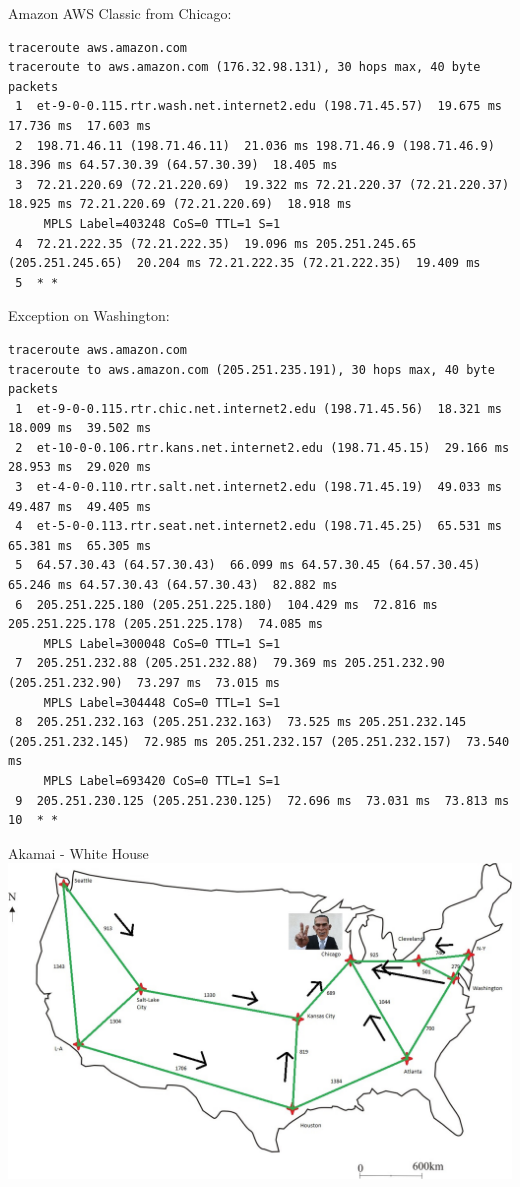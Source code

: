 \documentclass[usenames,dvipsnames]{beamer}
\begin{document}
\begin{frame}[fragile]{Amazon AWS}
Classic from Chicago:
\begin{lstlisting}
traceroute aws.amazon.com 
traceroute to aws.amazon.com (176.32.98.131), 30 hops max, 40 byte packets
 1  et-9-0-0.115.rtr.wash.net.internet2.edu (198.71.45.57)  19.675 ms  17.736 ms  17.603 ms
 2  198.71.46.11 (198.71.46.11)  21.036 ms 198.71.46.9 (198.71.46.9)  18.396 ms 64.57.30.39 (64.57.30.39)  18.405 ms
 3  72.21.220.69 (72.21.220.69)  19.322 ms 72.21.220.37 (72.21.220.37)  18.925 ms 72.21.220.69 (72.21.220.69)  18.918 ms
     MPLS Label=403248 CoS=0 TTL=1 S=1
 4  72.21.222.35 (72.21.222.35)  19.096 ms 205.251.245.65 (205.251.245.65)  20.204 ms 72.21.222.35 (72.21.222.35)  19.409 ms
 5  * *
\end{lstlisting}
Exception on Washington:
\begin{lstlisting}
traceroute aws.amazon.com 
traceroute to aws.amazon.com (205.251.235.191), 30 hops max, 40 byte packets
 1  et-9-0-0.115.rtr.chic.net.internet2.edu (198.71.45.56)  18.321 ms  18.009 ms  39.502 ms
 2  et-10-0-0.106.rtr.kans.net.internet2.edu (198.71.45.15)  29.166 ms  28.953 ms  29.020 ms
 3  et-4-0-0.110.rtr.salt.net.internet2.edu (198.71.45.19)  49.033 ms  49.487 ms  49.405 ms
 4  et-5-0-0.113.rtr.seat.net.internet2.edu (198.71.45.25)  65.531 ms  65.381 ms  65.305 ms
 5  64.57.30.43 (64.57.30.43)  66.099 ms 64.57.30.45 (64.57.30.45)  65.246 ms 64.57.30.43 (64.57.30.43)  82.882 ms
 6  205.251.225.180 (205.251.225.180)  104.429 ms  72.816 ms 205.251.225.178 (205.251.225.178)  74.085 ms
     MPLS Label=300048 CoS=0 TTL=1 S=1
 7  205.251.232.88 (205.251.232.88)  79.369 ms 205.251.232.90 (205.251.232.90)  73.297 ms  73.015 ms
     MPLS Label=304448 CoS=0 TTL=1 S=1
 8  205.251.232.163 (205.251.232.163)  73.525 ms 205.251.232.145 (205.251.232.145)  72.985 ms 205.251.232.157 (205.251.232.157)  73.540 ms
     MPLS Label=693420 CoS=0 TTL=1 S=1
 9  205.251.230.125 (205.251.230.125)  72.696 ms  73.031 ms  73.813 ms
10  * *
\end{lstlisting}
\end{frame}


\begin{frame}{Akamai - White House}
\includegraphics[width=\textwidth]{obama_carte.jpg}
\end{frame}
\end{document}
